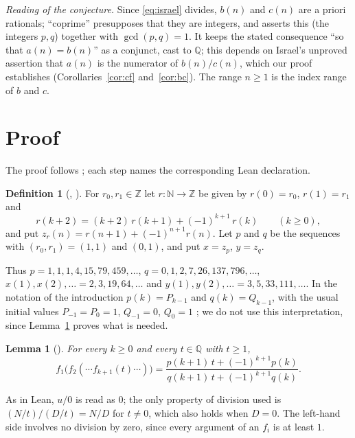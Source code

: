 \documentclass[11pt]{amsart}
\theoremstyle{plain}
\newtheorem{lemma}[theorem]{Lemma}
\theoremstyle{definition}
\newtheorem{definition}[theorem]{Definition}
\newcommand{\N}{\mathbb{N}}
\newcommand{\Z}{\mathbb{Z}}
\newcommand{\Q}{\mathbb{Q}}
\begin{document}
\emph{Reading of the conjecture.}
Since \eqref{eq:israel} divides, $b(n)$ and $c(n)$ are a priori rationals; ``coprime'' presupposes that they are integers, and  asserts this (the integers $p,q$) together with $\gcd(p,q)=1$. It keeps the stated consequence ``so that $a(n)=b(n)$'' as a conjunct, cast to $\Q$; this depends on Israel's unproved assertion that $a(n)$ is the numerator of $b(n)/c(n)$, which our proof establishes (Corollaries~\ref{cor:cf} and~\ref{cor:bc}). The range $n\ge1$ is the index range of $b$ and $c$.

\section{Proof}\label{sec:proof}

The proof follows ; each step names the corresponding Lean declaration.

\begin{definition}[, ]\label{def:seq}
For $r_0,r_1\in\Z$ let $r\colon\N\to\Z$ be given by $r(0)=r_0$, $r(1)=r_1$ and
\begin{equation}\label{eq:rec}
  r(k+2)=(k+2)\,r(k+1)+(-1)^{k+1}\,r(k)\qquad(k\ge0),
\end{equation}
and put $z_r(n)=r(n+1)+(-1)^{n+1}r(n)$. Let $p$ and $q$ be the sequences with $(r_0,r_1)=(1,1)$ and $(0,1)$, and put $x=z_p$, $y=z_q$.
\end{definition}

Thus $p=1,1,1,4,15,79,459,\dots$, $q=0,1,2,7,26,137,796,\dots$, $x(1),x(2),\ldots=2,3,19,64,\dots$ and $y(1),y(2),\ldots=3,5,33,111,\dots$. In the notation of the introduction $p(k)=P_{k-1}$ and $q(k)=Q_{k-1}$, with the usual initial values $P_{-1}=P_0=1$, $Q_{-1}=0$, $Q_0=1$ \cite{LW}; we do not use this interpretation, since Lemma~\ref{lem:fold} proves what is needed.

\begin{lemma}[]\label{lem:fold}
For every $k\ge0$ and every $t\in\Q$ with $t\ge1$,
\begin{equation}\label{eq:fold}
  f_1\bigl(f_2(\cdots f_{k+1}(t)\cdots)\bigr)
  =\frac{p(k+1)\,t+(-1)^{k+1}p(k)}{q(k+1)\,t+(-1)^{k+1}q(k)} .
\end{equation}
\end{lemma}

As in Lean, $u/0$ is read as $0$; the only property of division used is $(N/t)/(D/t)=N/D$ for $t\neq0$, which also holds when $D=0$. The left-hand side involves no division by zero, since every argument of an $f_i$ is at least $1$.
\end{document}
